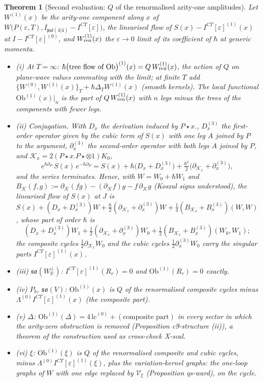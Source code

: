 \documentclass[11pt]{article}
\numberwithin{equation}{section}
\theoremstyle{plain}
\newtheorem{theorem}{Theorem}[section]
\theoremstyle{definition}
\newcommand{\Ob}{\mathrm{Ob}}
\newcommand{\ICT}{I^{CT}[\varepsilon]}
\newcommand{\lc}{\mathrm{lc}}
\begin{document}
\begin{theorem}[Second evaluation: $Q$ of the renormalised arity-one amplitudes]
\label{thm:at-second}
Let $W^{(1)}(x)$ be the arity-one component along $x$ of $W\big(P(\varepsilon,T),I_{\mathfrak{psl}(4|4)}-\ICT\big)$, the linearised flow of $S(x)-\ICT^{(1)}(x)$ at $I-\ICT^{(0)}$, and $W^{(1)}_{\rm ren}(x)$ the $\varepsilon\to0$ limit of its coefficient of $\hbar$ at generic momenta.
\begin{itemize}
\item (i) At $T=\infty$: $\hbar\big(\text{tree flow of }\Ob\big)^{(1)}(x)=Q\,W^{(1)}_{\rm ren}(x)$, the action of $Q$ on plane-wave values commuting with the limit; at finite $T$ add $\{W^{(0)},W^{(1)}(x)\}_T+\hbar\Delta_TW^{(1)}(x)$ (smooth kernels). The local functional $\Ob^{(1)}(x)|_n$ is the part of $Q\,W^{(1)}_{\rm ren}(x)$ with $n$ legs minus the trees of the components with fewer legs.
\item (ii) Conjugation. With $D_x$ the derivation induced by $P\star x.$, $D^{(3)}_x$ the first-order operator given by the cubic term of $S(x)$ with one leg $A$ joined by $P$ to the argument, $\partial^{(3)}_x$ the second-order operator with both legs $A$ joined by $P$, and $\mathcal K_x=2(P\star x.P\star\otimes1)K_0$,
\begin{equation}
e^{\hbar\partial_P}\,S(x)\,e^{-\hbar\partial_P}=S(x)+\hbar\big(D_x+D^{(3)}_x\big)+\tfrac{\hbar^2}2\big(\partial_{\mathcal K_x}+\partial^{(3)}_x\big),
\label{eq:at-conj}
\end{equation}
and the series terminates. Hence, with $W=W_0+\hbar W_1$ and $B_{\mathcal K}(f,g):=\partial_{\mathcal K}(fg)-(\partial_{\mathcal K}f)g-f\,\partial_{\mathcal K}g$ (Koszul signs understood), the linearised flow of $S(x)$ at $J$ is $S(x)+(D_x+D^{(3)}_x)W+\tfrac\hbar2(\partial_{\mathcal K_x}+\partial^{(3)}_x)W+\tfrac14(B_{\mathcal K_x}+B^{(3)}_x)(W,W)$, whose part of order $\hbar$ is
\[
(D_x+D^{(3)}_x)W_1+\tfrac12(\partial_{\mathcal K_x}+\partial^{(3)}_x)W_0+\tfrac12(B_{\mathcal K_x}+B^{(3)}_x)(W_0,W_1);
\]
the composite cycles $\tfrac12\partial_{\mathcal K_x}W_0$ and the cubic cycles $\tfrac12\partial^{(3)}_xW_0$ carry the singular parts $\ICT^{(1)}(x)$.
\item (iii) $\mathfrak{so}(W^\perp_{\mathbb R})$: $\ICT^{(1)}(R_r)=0$ and $\Ob^{(1)}(R_r)=0$ exactly.
\item (iv) $P_b$, $\mathfrak{so}(V)$: $\Ob^{(1)}(x)$ is $Q$ of the renormalised composite cycles minus $\Lambda^{(0)}\ICT^{(1)}(x)$ (the composite part).
\item (v) $\Delta$: $\Ob^{(1)}(\Delta)=4\,\lc^{(0)}+(\text{composite part})$ in every sector in which the arity-zero obstruction is removed (Proposition c9-structure (ii)), a theorem of the construction used as cross-check X-scal.
\item (vi) $\xi$: $\Ob^{(1)}(\xi)$ is $Q$ of the renormalised composite and cubic cycles, minus $\Lambda^{(0)}\ICT^{(1)}(\xi)$, plus the variation-kernel graphs: the one-loop graphs of $W$ with one edge replaced by $\mathcal V_\xi$ (Proposition qs-ward), on the cycle.
\end{itemize}
\end{theorem}
\end{document}
